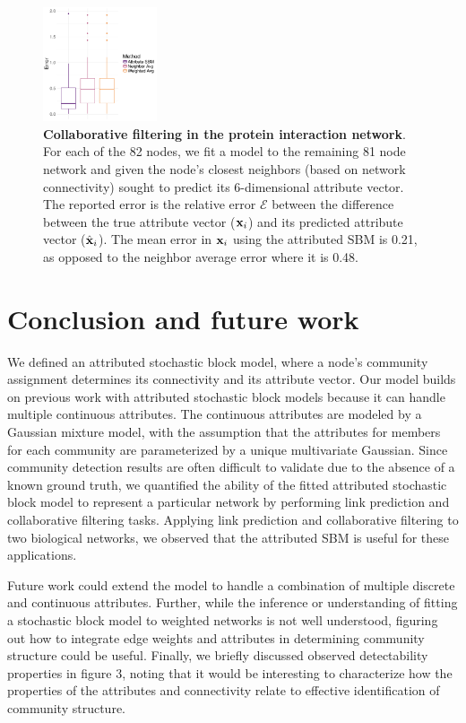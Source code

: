 \documentclass[journal]{IEEEtran}
\begin{document}
\begin{figure}[h!]
\begin{center}
\includegraphics[width=0.3\textwidth]{CollabProtein.pdf}
\caption{{\bf Collaborative filtering in the protein interaction network}. For each of the 82 nodes, we fit a model to the remaining 81 node network and given the node's closest  neighbors (based on network connectivity) sought to predict its 6-dimensional attribute vector. The reported error is the relative error $\mathcal{E}$ between the difference between the true attribute vector (${\bf x}_{i}$) and its predicted attribute vector (${\hat{\bf x}}_{i}$). The mean error in ${\bf x}_{i}$ using the attributed SBM is 0.21, as opposed to the neighbor average error where it is 0.48. }
\label{collabprotein}
\end{center}
\end{figure}

\section{Conclusion and future work}
We defined an attributed stochastic block model, where a node's community assignment determines its connectivity and its attribute vector. Our model builds on previous work with attributed stochastic block models because it can handle multiple continuous attributes. The continuous attributes are modeled by a Gaussian mixture model, with the assumption that the attributes for members for each community are parameterized by a unique multivariate Gaussian. Since community detection results are often difficult to validate due to the absence of a known ground truth, we quantified the ability of the fitted attributed stochastic block model to represent a particular network by performing link prediction and collaborative filtering tasks. Applying link prediction and collaborative filtering to two biological networks, we observed that the attributed SBM is useful for these applications.

Future work could extend the model to handle a combination of multiple discrete and continuous attributes. Further, while the inference or understanding of fitting a stochastic block model to weighted networks is not well understood, figuring out how to integrate edge weights and attributes in determining community structure could be useful. Finally, we briefly discussed observed detectability properties in figure 3, noting that it would be interesting to characterize how the properties of the attributes and connectivity relate to effective identification of community structure.
\end{document}
